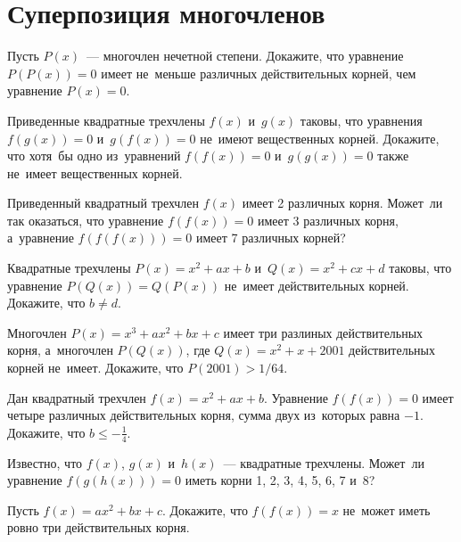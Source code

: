 
\section*{Суперпозиция многочленов}


\begin{problems}

\item
Пусть $P(x)$~--- многочлен нечетной степени.
Докажите, что уравнение $P(P(x)) = 0$ имеет не~меньше различных действительных
корней, чем уравнение $P(x) = 0$.

\item
Приведенные квадратные трехчлены $f(x)$ и~$g(x)$ таковы, что уравнения
$f(g(x)) = 0$ и~$g(f(x)) = 0$ не~имеют вещественных корней.
Докажите, что хотя~бы одно из~уравнений $f(f(x)) = 0$ и~$g(g(x)) = 0$ также
не~имеет вещественных корней.

\item
Приведенный квадратный трехчлен $f(x)$ имеет 2 различных корня.
Может~ли так оказаться, что уравнение $f(f(x)) = 0$ имеет 3 различных корня,
а~уравнение $f(f(f(x))) = 0$ имеет 7 различных корней?

\item
Квадратные трехчлены $P(x) = x^2 + a x + b$ и~$Q(x) = x^2 + c x + d$ таковы,
что уравнение $P(Q(x)) = Q(P(x))$ не~имеет действительных корней.
Докажите, что $b \neq d$.

\item
Многочлен $P(x) = x^3 + a x^2 + b x + c$ имеет три разлиных действительных
корня, а~многочлен $P(Q(x))$, где $Q(x) = x^2 + x + 2001$ действительных корней
не~имеет.
Докажите, что $P(2001) > 1 / 64$.

\item
Дан квадратный трехчлен $f(x) = x^2 + a x + b$.
Уравнение $f(f(x)) = 0$ имеет четыре различных действительных корня, сумма двух
из~которых равна $-1$.
Докажите, что $b \leq -\frac{1}{4}$.

\item
Известно, что $f(x)$, $g(x)$ и~$h(x)$~--- квадратные трехчлены.
Может~ли уравнение $f(g(h(x))) = 0$ иметь корни 1, 2, 3, 4, 5, 6, 7 и~8?

\item
Пусть $f(x) = a x^2 + b x + c$.
Докажите, что $f(f(x)) = x$ не~может иметь ровно три действительных корня.

\end{problems}

